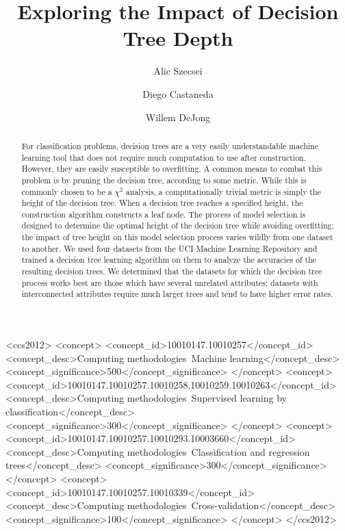 \documentclass[screen, authorversion, nonacm, sigconf]{acmart}
\begin{document}
\title{Exploring the Impact of Decision Tree Depth}

\author{Alic Szecsei}

\author{Diego Castaneda}

\author{Willem DeJong}

\begin{abstract}
  For classification problems, decision trees are a very easily understandable machine learning tool that does not require much computation to use after construction. However, they are easily susceptible to overfitting. A common means to combat this problem is by pruning the decision tree, according to some metric. While this is commonly chosen to be a $\chi^2$ analysis, a computationally trivial metric is simply the height of the decision tree. When a decision tree reaches a specified height, the construction algorithm constructs a leaf node. The process of model selection is designed to determine the optimal height of the decision tree while avoiding overfitting; the impact of tree height on this model selection process varies wildly from one dataset to another. We used four datasets from the UCI Machine Learning Repository and trained a decision tree learning algorithm on them to analyze the accuracies of the resulting decision trees. We determined that the datasets for which the decision tree process works best are those which have several unrelated attributes; datasets with interconnected attributes require much larger trees and tend to have higher error rates.
\end{abstract}

\begin{CCSXML}
  <ccs2012>
  <concept>
  <concept_id>10010147.10010257</concept_id>
  <concept_desc>Computing methodologies~Machine learning</concept_desc>
  <concept_significance>500</concept_significance>
  </concept>
  <concept>
  <concept_id>10010147.10010257.10010258.10010259.10010263</concept_id>
  <concept_desc>Computing methodologies~Supervised learning by classification</concept_desc>
  <concept_significance>300</concept_significance>
  </concept>
  <concept>
  <concept_id>10010147.10010257.10010293.10003660</concept_id>
  <concept_desc>Computing methodologies~Classification and regression trees</concept_desc>
  <concept_significance>300</concept_significance>
  </concept>
  <concept>
  <concept_id>10010147.10010257.10010339</concept_id>
  <concept_desc>Computing methodologies~Cross-validation</concept_desc>
  <concept_significance>100</concept_significance>
  </concept>
  </ccs2012>
\end{CCSXML}
\end{document}
